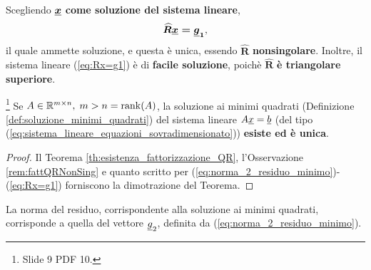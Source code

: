\addtocounter{footnote}{-6}







Scegliendo $\boldsymbol{\uline x}$ \textbf{come soluzione del sistema lineare},
\begin{equation}\label{eq:Rx=g1}
    \boldsymbol{\widehat R\uline x=\uline g_1},
\end{equation}
il quale ammette soluzione, e questa è unica, essendo $\boldsymbol{\widehat R}$ \textbf{nonsingolare}. Inoltre, il sistema lineare (\ref{eq:Rx=g1}) è di \textbf{facile soluzione}, poichè $\boldsymbol{\widehat R}$ \textbf{è triangolare superiore}.

\begin{theorem}\footnote{Slide 9 PDF 10.}
    Se $A\in\mathbb R^{m\times n},\; m>n=\operatorname{rank}(A)$, la soluzione ai minimi quadrati (Definizione \ref{def:soluzione_minimi_quadrati}) del sistema lineare $A\uline x=\uline b$ (del tipo (\ref{eq:sistema_lineare_equazioni_sovradimensionato})) \textbf{esiste ed è unica}.
\end{theorem}
\begin{proof}
     Il Teorema \ref{th:esistenza_fattorizzazione_QR}, l'Osservazione \ref{rem:fattQRNonSing} e quanto scritto per (\ref{eq:norma_2_residuo_minimo})-(\ref{eq:Rx=g1}) forniscono la dimotrazione del Teorema.
\end{proof}

\begin{remark}
    La norma del residuo, corrispondente alla soluzione ai minimi quadrati, corrisponde a quella del vettore $\uline g_2$, definita da (\ref{eq:norma_2_residuo_minimo}).
\end{remark}

